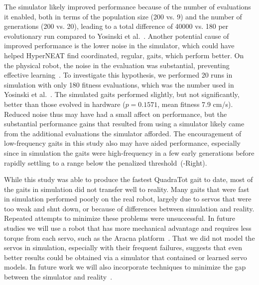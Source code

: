 The simulator likely improved performance because of the number of evaluations it enabled, both in terms of the population size (200 vs. 9) and the number of generations (200 vs. 20), leading
to a total difference of 40000 vs. 180 per evolutionary run compared to Yosinski et al.~\cite{yos:clune}. Another
potential cause of improved performance is the lower noise in the simulator, which could have helped HyperNEAT find coordinated, regular, gaits, which perform better. On the physical robot, the noise in the evaluation was
substantial, preventing effective learning~\cite{yos:clune}. 
To investigate this hypothesis, we performed 20 runs in simulation with only 180 fitness evaluations, which was the number used in Yosinski et al.~\cite{yos:clune}. The simulated gaits performed
slightly, but not significantly, better than those evolved in hardware ($p = 0.1571$, mean fitness 7.9 cm/s).
Reduced noise thus may have had a small affect on performance, but the substantial performance gains that resulted from using a simulator likely came from the additional evaluations the simulator afforded.
The encouragement of low-frequency gaits in this study
also may have aided performance, especially since in simulation the gaits were
high-frequency in a few early generations before rapidly settling to a
 range below the penalized threshold~(-Right).



While this study was able to produce the fastest QuadraTot gait to
date, most of the gaits in simulation did not transfer well to
reality. Many gaits that were fast in simulation performed
poorly on the real robot, largely due to servos that were too weak and
shut down, or because of differences between simulation and
reality. Repeated attempts to minimize these problems were
unsuccessful. 
In future studies we will use a
robot that has more mechanical advantage and requires less torque from
each servo, such as the Aracna platform~\cite{lohmann2012aracna}.
That we did not model the servos in simulation, especially with their frequent failures, suggests that even better results could be obtained via a simulator that contained or learned servo models. In future work we will also incorporate techniques to minimize the gap between the simulator and reality~\cite{koos2010crossing,bongard,zagal,koos2011transferability}.
